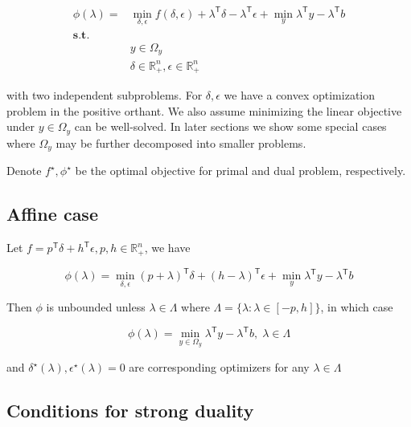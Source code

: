 \documentclass[../main]{subfiles}
\begin{document}
\begin{equation}\label{eq:dual}
  \begin{aligned}
    \phi(\lambda) = & \min_{\delta, \epsilon} f(\delta, \epsilon) + \lambda^\mathsf{T}\delta - \lambda^\mathsf{T} \epsilon+ \min_y \lambda^\mathsf{T} y - \lambda^\mathsf{T} b \\
    \mathbf{s.t.}   &                                                                                                                                                          \\
                    & y \in \Omega_y                                                                                                                                           \\
                    & \delta \in \mathbb{R}^n_+ , \epsilon \in \mathbb{R}^n_+
  \end{aligned}
\end{equation}

with two independent subproblems.
For \(\delta, \epsilon\) we have a convex optimization problem in the positive orthant.
We also assume minimizing the linear objective under \(y\in \Omega_y\) can be well-solved.
In later sections we show some special cases where \(\Omega_y\) may be further decomposed into smaller problems.

Denote $f^\star, \phi^\star$ be the optimal objective for primal and dual problem, respectively.


\subsection{Affine case}\label{affine-case}

Let \(f=p^\mathsf{T}\delta + h^\mathsf{T} \epsilon, p, h \in \mathbb R_+^n\), we have

\[\phi(\lambda) = \min_{\delta, \epsilon} (p+ \lambda)^\mathsf{T}\delta + (h - \lambda)^\mathsf{T} \epsilon+ \min_y \lambda^\mathsf{T} y - \lambda^\mathsf{T} b\]

Then \(\phi\) is unbounded unless \(\lambda \in \Lambda\) where
\(\Lambda = \{\lambda: \lambda \in [-p, h]\}\), in which case

\[\phi(\lambda) = \min_{y\in \Omega_y} \lambda^\mathsf{T} y - \lambda^\mathsf{T} b,\; \lambda\in \Lambda\]

and \(\delta^\star(\lambda), \epsilon^\star(\lambda)= 0\) are corresponding optimizers
for any \(\lambda \in \Lambda\)

\subsection{Conditions for strong
  duality}\label{conditions-for-strong-duality}
\end{document}
